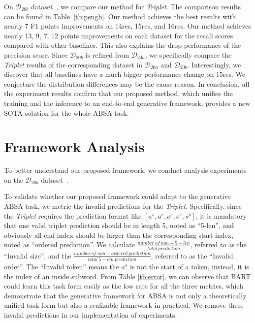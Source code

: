 \documentclass[11pt,a4paper]{article}
\begin{document}
On $\mathcal{D}_{20b}$ dataset~\citep{DBLP:conf/emnlp/XuLLB20}, we compare our method for \emph{Triplet}. The comparison results can be found in Table~\ref{tb:pengb}. Our method achieves the best results with nearly 7 F1 points improvements on 14res, 15res, and 16res. Our method achieves nearly 13, 9, 7, 12 points improvements on each dataset for the recall scores compared with other baselines. This also explains the drop performance of the precision score. Since $\mathcal{D}_{20b}$ is  refined from $\mathcal{D}_{20a}$, we specifically compare the \emph{Triplet} results of the corresponding dataset in $\mathcal{D}_{20a}$ and $\mathcal{D}_{20b}$. Interestingly, we discover that all baselines have a much bigger performance change on 15res. We conjecture the distribution differences may be the cause reason. In conclusion, all the experiment results confirm that our proposed method, which unifies the training and the inference to an  end-to-end generative framework, provides a new SOTA solution for the whole ABSA task.




















\section{Framework Analysis}
\label{sec:ana}
To better understand our proposed framework, we conduct analysis experiments on the $\mathcal{D}_{20b}$ dataset~\citep{DBLP:conf/emnlp/XuLLB20}.

To validate whether our proposed framework could adapt to the generative ABSA task, we metric the invalid predictions for the \emph{Triplet}. Specifically, since the \emph{Triplet} requires the prediction format like $[a^{s}, a^{e}, o^{s}, o^{e}, s^p]$, it is mandatory that one valid triplet prediction should be in length 5, noted as ``5-len'', and obviously all end index should be larger than the corresponding start index, noted as ``ordered prediction''. We calculate $\frac{  number \  of \  non-5-len}{total\  prediction}$, referred to as the ``Invalid size'', and the $\frac{ number\  of\  non-ordered\  prediction}{total\  5-len\  prediction}$, referred to as the ``Invalid order''.  The ``Invalid token'' means the $a^s$ is not the start of a token, instead, it is the index of an inside subword. From Table \ref{tb:error}, we can observe that BART could learn this task form easily as the low rate for all the three metrics, which demonstrate that the generative framework for ABSA is not only a theoretically unified task form but also  a realizable framework in practical. We remove these invalid predictions in our implementation of experiments.
\end{document}
